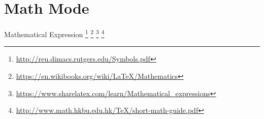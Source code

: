 \documentclass[10pt]{beamer}
\begin{document}
\section{Math Mode}


\begin{frame}{Mathematical Expression
\footnote{\url{http://reu.dimacs.rutgers.edu/Symbols.pdf}}   			   
\footnote{\url{https://en.wikibooks.org/wiki/LaTeX/Mathematics}}
\footnote{\url{https://www.sharelatex.com/learn/Mathematical_expressions}}
\footnote{\url{http://www.math.hkbu.edu.hk/TeX/short-math-guide.pdf}}
}
	\begin{itemize}
            
            
        
    \end{itemize}
\end{frame}
\end{document}
